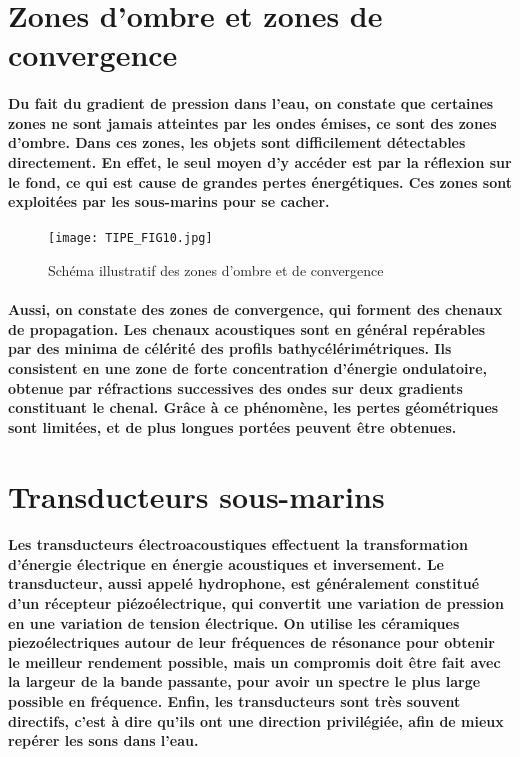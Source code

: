 \documentclass[a4paper,11pt]{article}
\begin{document}
\section{Zones d'ombre et zones de convergence}
\paragraph{\normalfont Du fait du gradient de pression dans l'eau, on constate que \textbf{certaines zones ne sont jamais atteintes par les ondes \'{e}mises}, ce sont des \textbf{zones d'ombre}. Dans ces zones, les objets sont difficilement d\'{e}tectables directement. En effet, le seul moyen d'y acc\'{e}der est par la r\'{e}flexion sur le fond, ce qui est cause de grandes pertes \'{e}nerg\'{e}tiques. Ces zones sont \textbf{exploit\'{e}es par les sous-marins pour se cacher}.}
\begin{figure}[!h]
\texttt{[image: TIPE\_FIG10.jpg]}
\caption{Sch\'{e}ma illustratif des zones d'ombre et de convergence}
\label{fig_10}
\end{figure}
\paragraph{\normalfont Aussi, on constate des \textbf{zones de convergence}, qui forment des \textbf{chenaux de propagation}. Les chenaux acoustiques sont en g\'{e}n\'{e}ral rep\'{e}rables par des \textbf{minima de c\'{e}l\'{e}rit\'{e} des profils bathyc\'{e}l\'{e}rim\'{e}triques}. Ils consistent en une zone de forte concentration d'\'{e}nergie ondulatoire, obtenue par r\'{e}fractions successives des ondes sur deux gradients constituant le chenal. Gr\^{a}ce \`{a} ce ph\'{e}nom\`{e}ne, les \textbf{pertes g\'{e}om\'{e}triques sont limit\'{e}es}, et de \textbf{plus longues port\'{e}es peuvent \^{e}tre obtenues}.}
\section{Transducteurs sous-marins}
\paragraph{\normalfont Les \textbf{transducteurs \'{e}lectroacoustiques} effectuent la transformation d'\'{e}nergie \'{e}lectrique en \'{e}nergie acoustiques et inversement. Le transducteur, aussi appel\'{e} hydrophone, est g\'{e}n\'{e}ralement constitu\'{e} d'un \textbf{r\'{e}cepteur pi\'{e}zo\'{e}lectrique}, qui convertit une variation de pression en une variation de tension \'{e}lectrique. On utilise les c\'{e}ramiques piezo\'{e}lectriques autour de leur fr\'{e}quences de r\'{e}sonance pour obtenir le meilleur rendement possible, mais un compromis doit \^{e}tre fait avec la largeur de la bande passante, pour avoir un spectre le plus large possible en fr\'{e}quence. Enfin, les transducteurs sont tr\`{e}s souvent \textbf{directifs}, c'est \`{a} dire qu'ils ont une direction privil\'{e}gi\'{e}e, afin de \textbf{mieux rep\'{e}rer les sons dans l'eau}.}
\end{document}
